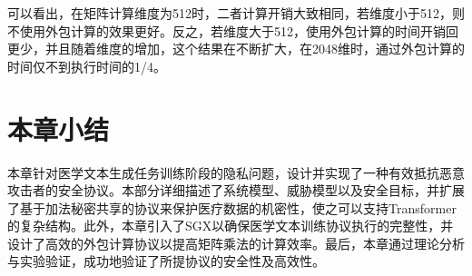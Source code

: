 可以看出，在矩阵计算维度为512时，二者计算开销大致相同，若维度小于512，则不使用外包计算的效果更好。反之，若维度大于512，使用外包计算的时间开销回更少，并且随着维度的增加，这个结果在不断扩大，在2048维时，通过外包计算的时间仅不到执行时间的1/4。

\section{本章小结}


本章针对医学文本生成任务训练阶段的隐私问题，设计并实现了一种有效抵抗恶意攻击者的安全协议。本部分详细描述了系统模型、威胁模型以及安全目标，并扩展了基于加法秘密共享的协议来保护医疗数据的机密性，使之可以支持Transformer的复杂结构。此外，本章引入了SGX以确保医学文本训练协议执行的完整性，并设计了高效的外包计算协议以提高矩阵乘法的计算效率。最后，本章通过理论分析与实验验证，成功地验证了所提协议的安全性及高效性。